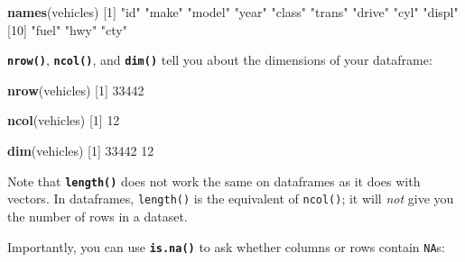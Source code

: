\documentclass[
]{book}
\newenvironment{Shaded}{\begin{snugshade}}{\end{snugshade}}
\newcommand{\DecValTok}[1]{\textcolor[rgb]{0.00,0.00,0.81}{#1}}
\newcommand{\FunctionTok}[1]{\textcolor[rgb]{0.13,0.29,0.53}{\textbf{#1}}}
\newcommand{\NormalTok}[1]{#1}
\newcommand{\StringTok}[1]{\textcolor[rgb]{0.31,0.60,0.02}{#1}}
\begin{document}
\begin{Shaded}
\begin{Highlighting}[]
\FunctionTok{names}\NormalTok{(vehicles) }
\NormalTok{ [}\DecValTok{1}\NormalTok{] }\StringTok{"id"}    \StringTok{"make"}  \StringTok{"model"} \StringTok{"year"}  \StringTok{"class"} \StringTok{"trans"} \StringTok{"drive"} \StringTok{"cyl"}   \StringTok{"displ"}
\NormalTok{[}\DecValTok{10}\NormalTok{] }\StringTok{"fuel"}  \StringTok{"hwy"}   \StringTok{"cty"}  
\end{Highlighting}
\end{Shaded}

\textbf{\texttt{nrow()}}, \textbf{\texttt{ncol()}}, and \textbf{\texttt{dim()}} tell you about the dimensions of your dataframe:

\begin{Shaded}
\begin{Highlighting}[]
\FunctionTok{nrow}\NormalTok{(vehicles) }
\NormalTok{[}\DecValTok{1}\NormalTok{] }\DecValTok{33442}
\end{Highlighting}
\end{Shaded}

\begin{Shaded}
\begin{Highlighting}[]
\FunctionTok{ncol}\NormalTok{(vehicles) }
\NormalTok{[}\DecValTok{1}\NormalTok{] }\DecValTok{12}
\end{Highlighting}
\end{Shaded}

\begin{Shaded}
\begin{Highlighting}[]
\FunctionTok{dim}\NormalTok{(vehicles) }
\NormalTok{[}\DecValTok{1}\NormalTok{] }\DecValTok{33442}    \DecValTok{12}
\end{Highlighting}
\end{Shaded}

Note that \textbf{\texttt{length()}} does not work the same on dataframes as it does with vectors. In dataframes, \texttt{length()} is the equivalent of \texttt{ncol()}; it will \emph{not} give you the number of rows in a dataset.

Importantly, you can use \textbf{\texttt{is.na()}} to ask whether columns or rows contain \texttt{NA}s:
\end{document}
